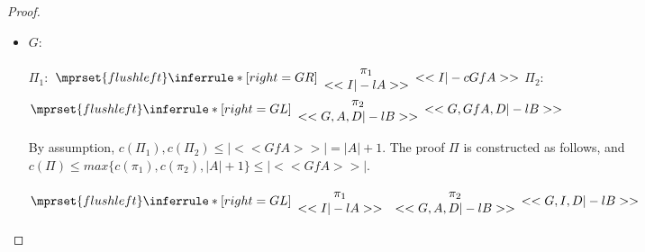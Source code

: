 \begin{proof}
\begin{enumerate}
\begin{itemize}
    \item $G$:
      \begin{center}
        \scriptsize
        $\Pi_1:$
        \begin{math}
          $$\mprset{flushleft}
          \inferrule* [right={\tiny GR}] {
            {
              \begin{array}{c}
                \pi_1 \\
                {<<I |-l A>>}
              \end{array}
            }
          }{<<I |-c Gf A>>}
        \end{math}
        \qquad\qquad
        $\Pi_2:$
        \begin{math}
          $$\mprset{flushleft}
          \inferrule* [right={\tiny GL}] {
            {
              \begin{array}{c}
                \pi_2 \\
                {<<G, A, D |-l B>>}
              \end{array}
            }
          }{<<G, Gf A, D |-l B>>}
        \end{math}
      \end{center}
      By assumption, $c(\Pi_1),c(\Pi_2)\leq |<<Gf A>>| = |A|+1$. The proof $\Pi$ is
      constructed as follows, and $c(\Pi)\leq max\{c(\pi_1),c(\pi_2),|A|+1\}\leq |<<Gf A>>|$.
      \begin{center}
        \scriptsize
        \begin{math}
          $$\mprset{flushleft}
          \inferrule* [right={\tiny GL}] {
            {
              \begin{array}{cc}
                \pi_1 & \pi_2 \\
                {<<I |-l A>>} & {<<G, A, D |-l B>>}
              \end{array}
            }
          }{<<G, I, D |-l B>>}
        \end{math}
      \end{center}
    \end{itemize}


\end{enumerate}
\end{proof}
